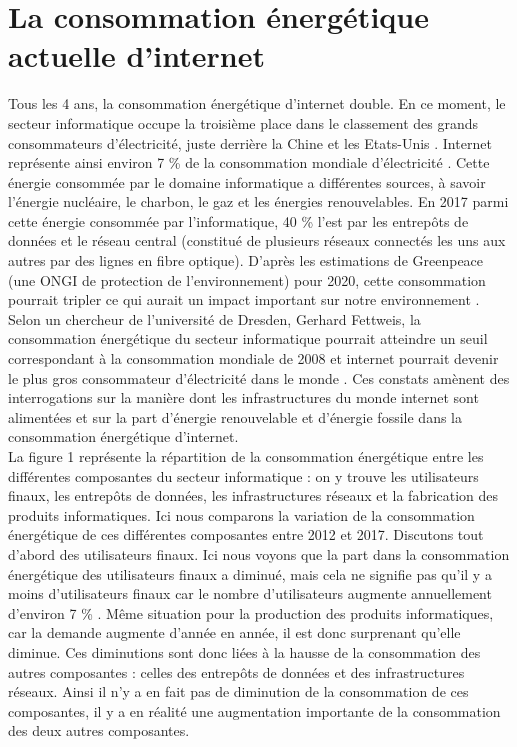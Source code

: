 \documentclass[a4paper,twocolumn,12pt]{article}
\begin{document}
\section{La consommation énergétique actuelle d'internet}

	Tous les 4 ans, la consommation énergétique d'internet double. En ce moment, le secteur informatique occupe la troisième place dans le classement des grands consommateurs d'électricité, juste derrière la Chine et les Etats-Unis \cite{2}. Internet représente ainsi environ 7 \% de la consommation mondiale d’électricité \cite{3}. Cette énergie consommée par le domaine informatique a différentes sources, à savoir l’énergie nucléaire, le charbon, le gaz et les énergies renouvelables. En 2017 parmi cette énergie consommée par l’informatique, 40 \% l’est par les entrepôts de données et le réseau central (constitué de plusieurs réseaux connectés les uns aux autres par des lignes en fibre optique). D'après les estimations de Greenpeace (une ONGI de protection de l'environnement) pour 2020, cette consommation pourrait tripler ce qui aurait un impact important sur notre environnement \cite{3}. Selon un chercheur de l'université de Dresden, Gerhard Fettweis, la consommation énergétique du secteur informatique pourrait atteindre un seuil correspondant à la consommation mondiale de 2008 et internet pourrait devenir le plus gros consommateur d'électricité dans le monde \cite{2}. Ces constats amènent des interrogations sur la manière dont les infrastructures du monde internet sont alimentées et sur la part d'énergie renouvelable et d'énergie fossile dans la consommation énergétique d’internet. \\
	
	La figure 1 représente la répartition de la consommation énergétique entre les différentes composantes du secteur informatique : on y trouve les utilisateurs finaux, les entrepôts de données, les infrastructures réseaux et la fabrication des produits informatiques. Ici nous comparons la variation de la consommation énergétique de ces différentes composantes entre 2012 et 2017. Discutons tout d’abord des utilisateurs finaux. Ici nous voyons que la part dans la consommation énergétique des utilisateurs finaux a diminué, mais cela ne signifie pas qu'il y a moins d’utilisateurs finaux car le nombre d’utilisateurs augmente annuellement d'environ 7 \% \cite{4}. Même situation pour la production des produits informatiques, car la demande augmente d’année en année, il est donc surprenant qu’elle diminue. Ces diminutions sont donc liées à la hausse de la consommation des autres composantes : celles des entrepôts de données et des infrastructures réseaux. Ainsi il n’y a en fait pas de diminution de la consommation de ces composantes, il y a en réalité une augmentation importante de la consommation des deux autres composantes.
\end{document}
